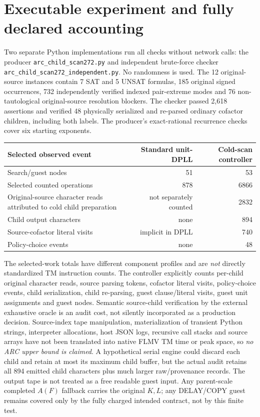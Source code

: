 \documentclass[11pt]{article}
\begin{document}
\section{Executable experiment and fully declared accounting}
Two separate Python implementations run all checks without network calls: the producer \texttt{arc\_child\_scan272.py} and independent brute-force checker \texttt{arc\_child\_scan272\_independent.py}. No randomness is used. The 12 original-source instances contain 7 SAT and 5 UNSAT formulas, 185 original signed occurrences, 732 independently verified indexed pair-extreme modes and 76 non-tautological original-source resolution blockers. The checker passed 2,618 assertions and verified 48 physically serialized and re-parsed ordinary cofactor children, including both labels. The producer's exact-rational recurrence checks cover six starting exponents.

\begin{center}
\begin{tabular}{lrr}
\toprule
Selected observed event & Standard unit-DPLL & Cold-scan controller\\
\midrule
Search/guest nodes & 51 & 53\\
Selected counted operations & 878 & 6866\\
Original-source character reads attributed to cold child preparation & not separately counted & 2832\\
Child output characters & none & 894\\
Source-cofactor literal visits & implicit in DPLL & 740\\
Policy-choice events & none & 48\\
\bottomrule
\end{tabular}
\end{center}

The selected-work totals have different component profiles and are \emph{not} directly standardized TM instruction counts. The controller explicitly counts per-child original character reads, source parsing tokens, cofactor literal visits, policy-choice events, child serialization, child re-parsing, guest clause/literal visits, guest unit assignments and guest nodes. Semantic source-child verification by the external exhaustive oracle is an audit cost, not silently incorporated as a production decision. Source-index tape manipulation, materialization of transient Python strings, interpreter allocations, host JSON logs, recursive call stacks and source arrays have not been translated into native FLMV TM time or peak space, so \emph{no ARC upper bound is claimed}. A hypothetical serial engine could discard each child and retain at most its maximum child buffer, but the actual audit retains all 894 emitted child characters plus much larger raw/provenance records. The output tape is not treated as a free readable guest input. Any parent-scale completed $A(F)$ fallback carries the original $K,L$; any DELAY/COPY guest remains covered only by the fully charged intended contract, not by this finite test.
\end{document}
